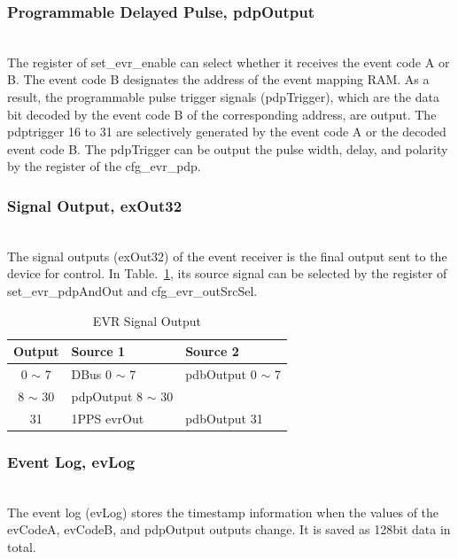 \documentclass[journal,reqno]{IEEEtran}
\begin{document}
\subsubsection{Programmable Delayed Pulse, pdpOutput}\hspace*{\fill} \\
The register of set\_evr\_enable can select whether it receives the event code A or B. The event code B designates the address of the event mapping RAM. As a result, the programmable pulse trigger signals (pdpTrigger), which are the data bit decoded by the event code B of the corresponding address, are output. The pdptrigger 16 to 31 are selectively generated by the event code A or the decoded event code B. The pdpTrigger can be output the pulse width, delay, and polarity by the register of the cfg\_evr\_pdp.\newline

\subsubsection{Signal Output, exOut32}\hspace*{\fill} \\
The signal outputs (exOut32) of the event receiver is the final output sent to the device for control. In Table.~\ref*{evr_signal_output}, its source signal can be selected by the register of set\_evr\_pdpAndOut and cfg\_evr\_outSrcSel.

\begin{table}[h!t]
	\centering
	\caption{EVR Signal Output}
	\label{evr_signal_output}
	
	\begin{tabular}{@{}cll@{}}
		
		\hline
		\textbf{Output}	& \textbf{Source 1}				& \textbf{Source 2}\\
		\hline
		0 $\sim$ 7			& DBus 0 $\sim$ 7			& pdbOutput 0 $\sim$ 7\\
		8 $\sim$ 30			& pdpOutput 8 $\sim$ 30     \\
		31				& 1PPS evrOut					& pdbOutput 31\\        								
		\hline
	\end{tabular}
\end{table}

\subsubsection{Event Log, evLog}\hspace*{\fill} \\
The event log (evLog) stores the timestamp information when the values of the evCodeA, evCodeB, and pdpOutput outputs change. It is saved as 128bit data in total.\newline
\end{document}
